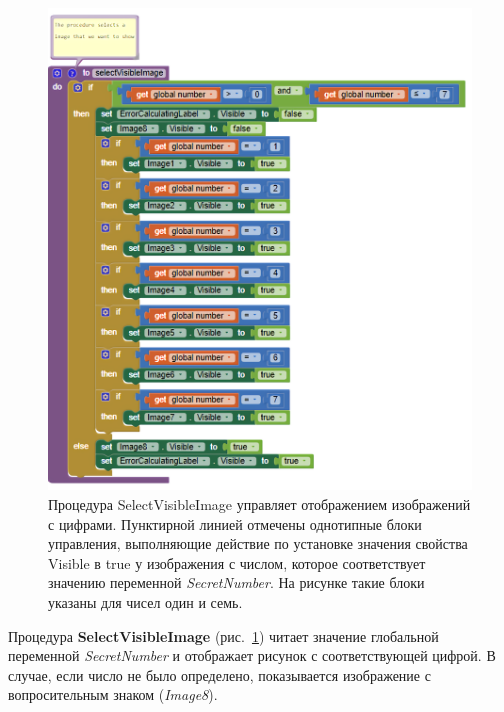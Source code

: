 \begin{figure}
  \includegraphics{./graphics/programs/guess_numbers/procedure_selectVisibleImage_AppInventor_2018.png}
    \caption[Процедура SelectVisibleImage.]{Процедура SelectVisibleImage управляет отображением изображений с цифрами. Пунктирной линией отмечены однотипные блоки управления, выполняющие действие по установке значения свойства Visible в true у изображения с числом, которое соответствует значению переменной \textit{SecretNumber}. На рисунке такие блоки указаны для чисел один и семь.}
  \label{fig:block:click:select:visible:image}
\end{figure}

Процедура \textbf{SelectVisibleImage} (рис.~\ref{fig:block:click:select:visible:image}) читает значение глобальной переменной \textit{SecretNumber} и отображает рисунок с соответствующей цифрой.
В случае, если число не было определено, показывается изображение с вопросительным знаком (\textit{Image8}).

